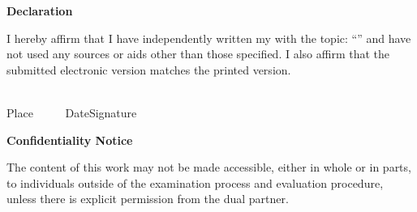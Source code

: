 

\newpage
\thispagestyle{empty}
\begin{framed}
    \begin{center}
    \Large\bfseries Declaration 
    \end{center} \medskip 
    \noindent 
    I hereby affirm that I have independently written my \Was \space with the topic: 
    \enquote{\Titel} and have not used any sources or aids other than those specified. 
    I also affirm that the submitted electronic version matches the printed version. 
    
    \vspace{3cm}\noindent\underline{\vspace{3cm}\hspace{4cm}}\hfill\underline{\hspace{6cm}}\\
    Place ~~~~~Date\hfill Signature\hspace{4cm}
    \end{framed}
    
    \vfill
    \begin{framed}
    \begin{center}
    \Large\bfseries Confidentiality Notice
    \end{center}
    \medskip
    \noindent
    The content of this work may not be made accessible, either in whole or in parts, to individuals outside of the examination process and evaluation procedure, unless there is explicit permission from the dual partner.
\end{framed}

\endinput
